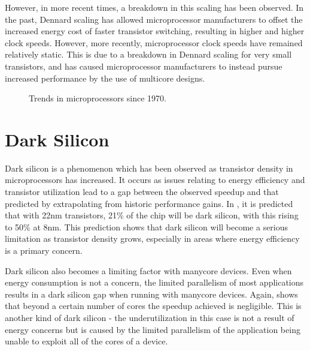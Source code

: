 \documentclass{UoYCSproject}
\begin{document}
However, in more recent times, a breakdown in this scaling has been observed. In the past, Dennard scaling has allowed
microprocessor manufacturers to offset the increased energy cost of faster transistor switching, resulting in higher
and higher clock speeds. However, more recently, microprocessor clock speeds have remained relatively static. This is
due to a breakdown in Dennard scaling for very small transistors, and has caused microprocessor manufacturers to instead
pursue increased performance by the use of multicore designs.

\begin{figure}[h]
\caption{Trends in microprocessors since 1970. \cite{karlrupp}}
\end{figure}

\section{Dark Silicon}

Dark silicon is a phenomenon which has been observed as transistor density in microprocessors has increased.
It occurs as issues relating to energy efficiency and transistor utilization lead to a gap between the
observed speedup and that predicted by extrapolating from historic performance gains.
In \cite{darksilicon}, it is predicted that with 22nm transistors, 21\% of the chip will be dark silicon,
with this rising to 50\% at 8nm. This prediction shows that dark silicon will become a serious limitation
as transistor density grows, especially in areas where energy efficiency is a primary concern.

Dark silicon also becomes a limiting factor with manycore devices. Even when energy consumption is not a
concern, the limited parallelism of most applications results in a dark silicon gap when running with
manycore devices. Again, \cite{darksilicon} shows that beyond a certain number of cores the speedup achieved
is negligible. This is another kind of dark silicon - the underutilization in this case is not a result of
energy concerns but is caused by the limited parallelism of the application being unable to exploit all of
the cores of a device.
\end{document}
